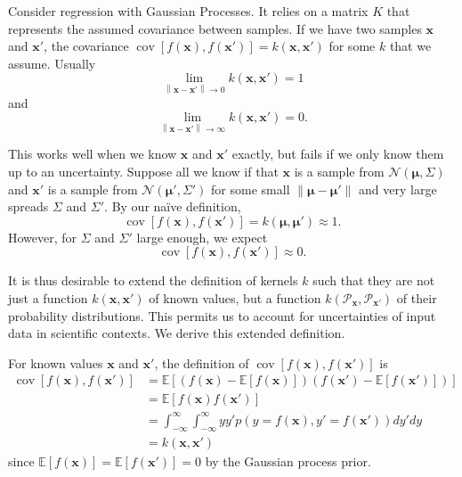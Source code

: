\documentclass[oneside, 11pt]{article}
\DeclareMathOperator{\cov}{cov}
\begin{document}
Consider regression with Gaussian Processes. It relies on a matrix $K$ that represents the assumed covariance between samples. If we have two samples $\mathbf{x}$ and $\mathbf{x}'$, the covariance $\cov\left[f(\mathbf{x}),f(\mathbf{x}')\right] = k(\mathbf{x}, \mathbf{x}')$ for some $k$ that we assume. Usually \[
    \lim_{\left\|\mathbf{x} - \mathbf{x}'\right\| \to 0}k(\mathbf{x}, \mathbf{x}') = 1
\] and \[
    \lim_{\left\|\mathbf{x} - \mathbf{x}'\right\| \to \infty}k(\mathbf{x}, \mathbf{x}') = 0 \text{.}
\]

This works well when we know $\mathbf{x}$ and $\mathbf{x}'$ exactly, but fails if we only know them up to an uncertainty. Suppose all we know if that $\mathbf{x}$ is a sample from $\mathcal{N}(\bm{\mu}, \Sigma)$ and $\mathbf{x}'$ is a sample from $\mathcal{N}(\bm{\mu}', \Sigma')$ for some small $\|\bm{\mu} - \bm{\mu}'\|$ and very large spreads $\Sigma$ and $\Sigma'$. By our na\"ive definition,\[
    \cov\left[f(\mathbf{x}),f(\mathbf{x}')\right] = k(\bm{\mu}, \bm{\mu}') \approx 1 \text{.}
\] However, for $\Sigma$ and $\Sigma'$ large enough, we expect\[
    \cov\left[f(\mathbf{x}),f(\mathbf{x}')\right] \approx 0 \text{.}
\]

It is thus desirable to extend the definition of kernels $k$ such that they are not just a function $k(\mathbf{x}, \mathbf{x}')$ of known values, but a function $k(\mathcal{P}_\mathbf{x}, \mathcal{P}_{\mathbf{x}'})$ of their probability distributions. This permits us to account for uncertainties of input data in scientific contexts. We derive this extended definition.

For known values $\mathbf{x}$ and $\mathbf{x}'$, the definition of $\cov[f(\mathbf{x}),f(\mathbf{x}')]$ is \begin{align*}
    \cov\left[f(\mathbf{x}),f(\mathbf{x}')\right] &= \mathbb{E}\left[\left(f\left(\mathbf{x}\right) - \mathbb{E}\left[f\left(\mathbf{x}\right)\right]\right)\left(f\left(\mathbf{x}'\right) - \mathbb{E}\left[f\left(\mathbf{x}'\right)\right]\right)\right] \\
    &= \mathbb{E}\left[f\left(\mathbf{x}\right)f\left(\mathbf{x}'\right)\right] \\
    &= \int_{-\infty}^{\infty} \int_{-\infty}^{\infty} y y' p\left(y = f\left(\mathbf{x}\right), y' = f\left(\mathbf{x}'\right)\right) dy'dy \\
    &= k(\mathbf{x}, \mathbf{x}')
\end{align*} since $\mathbb{E}[f(\mathbf{x})] = \mathbb{E}[f(\mathbf{x}')] = 0$ by the Gaussian process prior.
\end{document}
